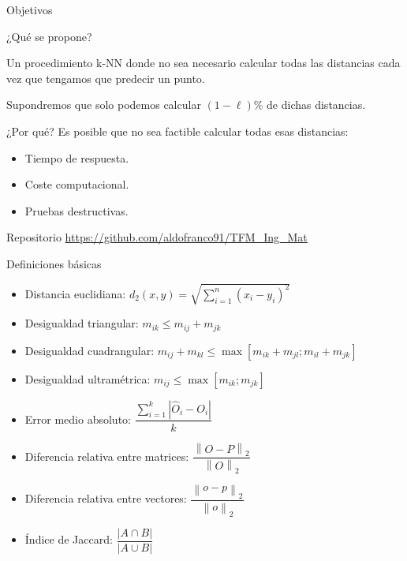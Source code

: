 \documentclass[10pt]{beamer}
\newcommand{\norm}[1]{\left\lVert#1\right\rVert}
\begin{document}
\begin{frame}{Objetivos}

\begin{block}{¿Qué se propone?}
	\item Un procedimiento k-NN donde no sea necesario calcular todas las distancias  cada vez que tengamos que predecir un  punto. 
	
	Supondremos que solo podemos calcular $(1-\ell)\%$ de dichas distancias.
\end{block}

\begin{block}{¿Por qué?}
Es posible que no sea factible calcular todas esas distancias:
    \begin{itemize}
	    \item Tiempo de respuesta.
	    \item Coste computacional.
	    \item Pruebas destructivas.
	\end{itemize}
\end{block}

\begin{alertblock}{Repositorio}
\url{https://github.com/aldofranco91/TFM\_Ing\_Mat}
\end{alertblock}

\end{frame}

\begin{frame}{Definiciones básicas}

\begin{block}{}
\begin{itemize}
    \item Distancia euclidiana: $d_2(x,y) = \sqrt{\sum_{i=1}^{n}(x_i-y_i)^2}$ 
    \item Desigualdad triangular:  $m_{ik} \leq m_{ij} + m_{jk}$
     \item Desigualdad cuadrangular: $m_{ij} + m_{kl} \leq \max[m_{ik}+m_{jl} ; m_{il}+m_{jk}]$ 
    \item Desigualdad ultramétrica: $m_{ij} \leq \max[m_{ik};m_{jk}] $
    \item Error medio absoluto: $ \dfrac{\sum_{i=1}^{k}\left| \widehat{O}_{i} - O_{i}\right|}{k} $
    \item Diferencia relativa entre matrices: $\dfrac{\norm{O-P}_2}{\norm{O}_2}$
     \item Diferencia relativa entre vectores: $\dfrac{\norm{o-p}_2}{\norm{o}_2}$
    \item Índice de Jaccard: $\dfrac{\left| A \cap B \right| }{\left| A \cup B \right|}$
\end{itemize}
\end{block}
\end{frame}
\end{document}
